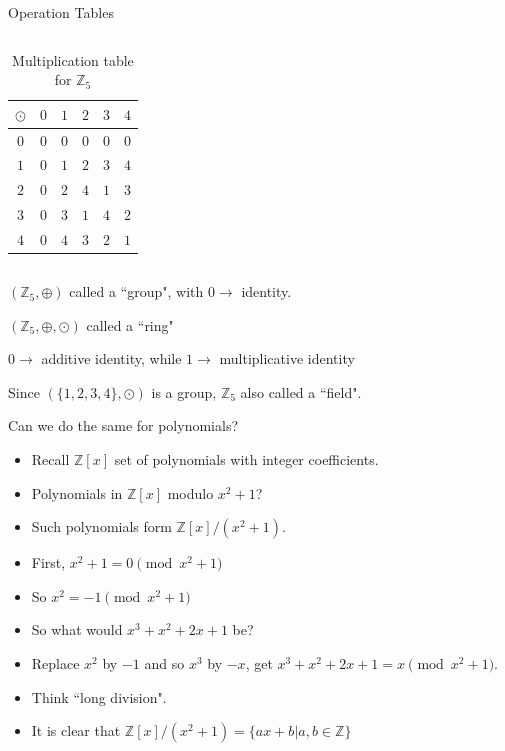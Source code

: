 \documentclass[ %
usenames,dvipsnames,
aspectratio=169,11pt]{beamer}
\newenvironment{stepitemize}{\begin{itemize}[<+->]}{\end{itemize} }
\newcommand{\Z}{\mathbb{Z}}
\begin{document}
\begin{frame}{Operation Tables}
\begin{itemize}
{\begin{columns}
        \begin{column}{0.4\textwidth}
    \begin{table}
            \begin{tabular}{ c| c | c |c|c|c}
$\odot$  & $0$ & {\color{red}$1$} & {\color{red} $2$} & {\color{red}$3$}& {\color{red}$4$}\\
\hline
$0$ & $0$ & $0$ & $0$ & $0$& $0$ \\
\hline 
{\color{red} $1$} & $0$ & {\color{red}$1$} & {\color{red}$2$} & {\color{red}$3$} & {\color{red}$4$} \\
\hline
{\color{red}$2$}& $0$ & {\color{red}$2$} &{\color{red}$4$} & {\color{red}$1$} & {\color{red} $3$}\\
\hline
{\color{red} $3$}& $0$ & {\color{red}$3$} &{\color{red}$1$} & {\color{red}$4$} & {\color{red}$2$}\\
\hline 
{\color{red}$4$}& $0$ & {\color{red}$4$} & {\color{red}$3$} & {\color{red}$2$} & {\color{red}$1$} 
\end{tabular}
\caption{Multiplication table for $\Z_5$}
\end{table}
    \end{column}
\end{columns}
\bigskip 
 \item $(\Z_5,\oplus)$ called a ``group", with $0 \rightarrow$ identity.
   \item $(\Z_5, \oplus, \odot)$ called a ``ring" 
   \item $0 \rightarrow$ additive identity, while $1\rightarrow$ multiplicative identity
    \item Since $(\{1,2,3,4\},\odot)$ is a group, $\Z_5$ also called a ``field". 
 
  }

\end{itemize}

\end{frame}

\begin{frame}{Can we do the same for polynomials?}
    \begin{stepitemize}
    \item Recall $\Z[x]$ set of polynomials with integer coefficients.
    \item Polynomials in $\Z[x]$ modulo $x^2+1$?
    \item Such polynomials form $\Z[x]/(x^2+1)$.
    \item First, $x^2+1=0 \pmod{x^2+1}$
    \item So $x^2=-1 \pmod{x^2+1}$
    \item So what would $x^3+x^2+2x+1$ be?
    \item Replace $x^2$ by $-1$ and so $x^3$ by $-x$, get $x^3+x^2+2x+1 = x \pmod{x^2+1}$. 
    \item Think ``long division".
    \item It is clear that 
    $\Z[x]/(x^2+1) = \{ax+b|a, b\in \Z\}$
    \end{stepitemize}
\end{frame}
\end{document}
